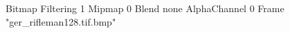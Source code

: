 {Bitmap
	{Filtering 1}
	{Mipmap 0}
	{Blend none}
	{AlphaChannel 0}
	{Frame "ger_rifleman128.tif.bmp"}
}
